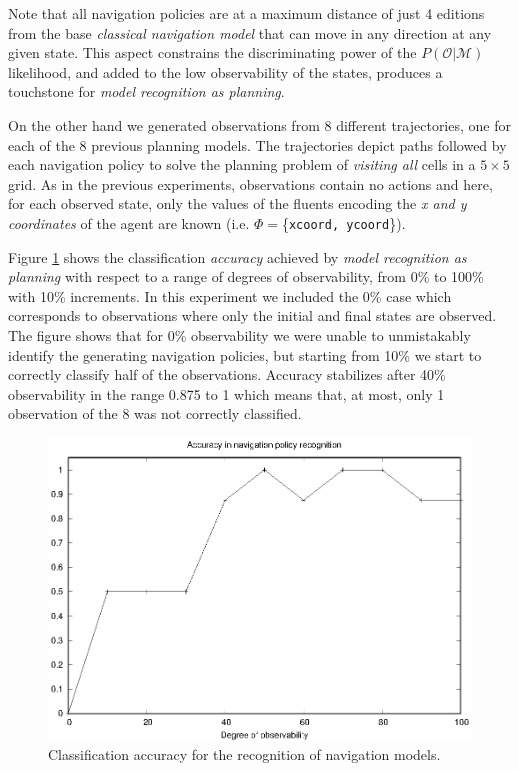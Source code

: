 \documentclass[letterpaper]{article} %
\begin{document}
Note that all navigation policies are at a maximum distance of just 4 editions from the base {\em classical navigation model} that can move in any direction at any given state. This aspect constrains the discriminating power of the $P(\mathcal{O}|\mathcal{M})$ likelihood, and added to the low observability of the states, produces a touchstone for {\em model recognition as planning}.

On the other hand we generated observations from 8 different trajectories, one for each of the 8 previous planning models. The trajectories depict paths followed by each navigation policy to solve the planning problem of {\em visiting all} cells in a $5\times 5$ grid. As in the previous experiments, observations contain no actions and here, for each observed state, only the values of the fluents encoding the {\em x and y coordinates} of the agent are known (i.e. $\Phi =$\{{\small\tt xcoord, ycoord}\}).

Figure \ref{fig:navigation_acc} shows the classification {\em accuracy} achieved by {\em model recognition as planning} with respect to a range of degrees of observability, from 0\% to 100\% with 10\% increments. In this experiment we included the 0\% case which corresponds to observations where only the initial and final states are observed. The figure shows that for 0\% observability we were unable to unmistakably identify the generating navigation policies, but starting from 10\% we start to correctly classify half of the observations. Accuracy stabilizes after 40\% observability in the range 0.875 to 1 which means that, at most, only 1 observation of the 8 was not correctly classified.

\begin{figure}
	\centering
	\includegraphics[width=0.9\linewidth]{figures/navigation.eps}
	\caption{Classification accuracy for the recognition of navigation models.}
	\label{fig:navigation_acc}
\end{figure}
\end{document}
